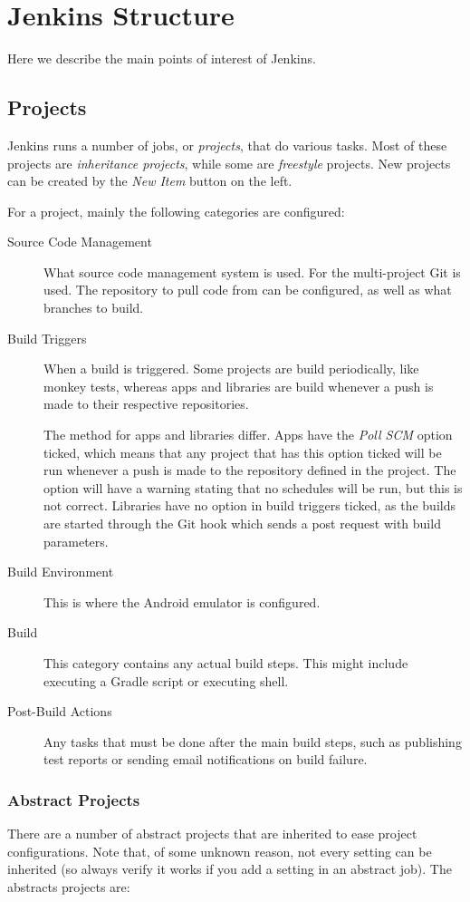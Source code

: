 \chapter{Jenkins Structure}\label{app:jenkins_structure}
Here we describe the main points of interest of Jenkins.

\section{Projects}
Jenkins runs a number of jobs, or \emph{projects}, that do various tasks. Most of these projects are \emph{inheritance projects}, while some are \emph{freestyle} projects. New projects can be created by the \emph{New Item} button on the left.

For a project, mainly the following categories are configured:

\begin{description}
  \item[Source Code Management] What source code management system is used. For the multi-project Git is used. The repository to pull code from can be configured, as well as what branches to build.
  \item[Build Triggers] When a build is triggered. Some projects are build periodically, like monkey tests, whereas apps and libraries are build whenever a push is made to their respective repositories.

  The method for apps and libraries differ. Apps have the \emph{Poll SCM} option ticked, which means that any project that has this option ticked will be run whenever a push is made to the repository defined in the project. The option will have a warning stating that no schedules will be run, but this is not correct. Libraries have no option in build triggers ticked, as the builds are started through the Git hook which sends a post request with build parameters.
  \item[Build Environment] This is where the Android emulator is configured.
  \item[Build] This category contains any actual build steps. This might include executing a Gradle script or executing shell.
  \item[Post-Build Actions] Any tasks that must be done after the main build steps, such as publishing test reports or sending email notifications on build failure.
\end{description}

\subsection{Abstract Projects}
There are a number of abstract projects that are inherited to ease project configurations. Note that, of some unknown reason, not every setting can be inherited (so always verify it works if you add a setting in an abstract job). The abstracts projects are:

